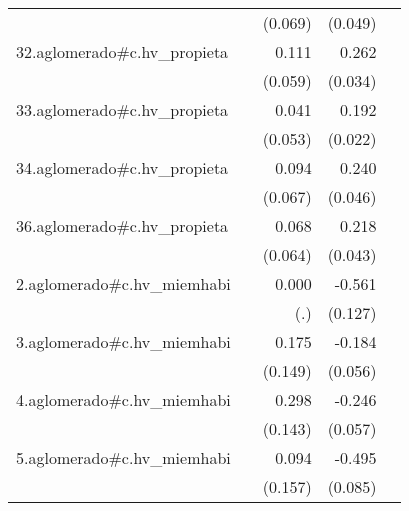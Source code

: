 {\begin{longtable}{l*{4}{D{.}{.}{-1}}}
            &                     &     (0.069)         &     (0.049)         &                     \\
\addlinespace
32.aglomerado#c.hv\_propieta&                     &       0.111         &       0.262\sym{***}&                     \\
            &                     &     (0.059)         &     (0.034)         &                     \\
\addlinespace
33.aglomerado#c.hv\_propieta&                     &       0.041         &       0.192\sym{***}&                     \\
            &                     &     (0.053)         &     (0.022)         &                     \\
\addlinespace
34.aglomerado#c.hv\_propieta&                     &       0.094         &       0.240\sym{***}&                     \\
            &                     &     (0.067)         &     (0.046)         &                     \\
\addlinespace
36.aglomerado#c.hv\_propieta&                     &       0.068         &       0.218\sym{***}&                     \\
            &                     &     (0.064)         &     (0.043)         &                     \\
\addlinespace
2.aglomerado#c.hv\_miemhabi&                     &       0.000         &      -0.561\sym{***}&                     \\
            &                     &         (.)         &     (0.127)         &                     \\
\addlinespace
3.aglomerado#c.hv\_miemhabi&                     &       0.175         &      -0.184\sym{**} &                     \\
            &                     &     (0.149)         &     (0.056)         &                     \\
\addlinespace
4.aglomerado#c.hv\_miemhabi&                     &       0.298\sym{*}  &      -0.246\sym{***}&                     \\
            &                     &     (0.143)         &     (0.057)         &                     \\
\addlinespace
5.aglomerado#c.hv\_miemhabi&                     &       0.094         &      -0.495\sym{***}&                     \\
            &                     &     (0.157)         &     (0.085)         &                     \\

\end{longtable}}
